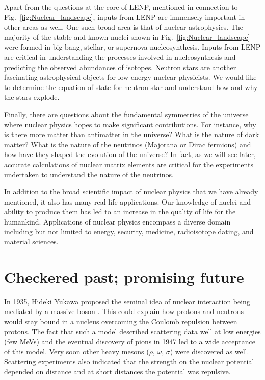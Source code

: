 	Apart from the questions at the core of LENP, mentioned in connection to
	Fig.~\ref{fig:Nuclear_landscape}, inputs from LENP are immensely important
	in other areas as well.  One such broad area is that of nuclear astrophysics.
	The majority of the stable
	and known nuclei shown in Fig.~\ref{fig:Nuclear_landscape} were formed in
	big bang, stellar, or supernova nucleosynthesis.  Inputs from LENP are
	critical in understanding the processes involved in nucleosynthesis and
	predicting the observed abundances of isotopes.
	Neutron stars are another fascinating astrophysical objects for low-energy
	nuclear physicists.  We would like to determine the equation of state for
	neutron star and understand how and why the stars explode.

	Finally, there are questions about the fundamental symmetries of the universe
	where
	nuclear physics hopes to make significant contributions.  For instance,
	why is there more matter than antimatter in the universe?  What is the nature
	of dark matter?  What is the nature of the neutrinos (Majorana or Dirac
	fermions) and how have they shaped the evolution of the universe?
	In fact, as we will see later, accurate calculations of nuclear matrix
	elements are critical for the experiments undertaken to understand the
	nature of the	neutrinos.

	In addition to the broad scientific impact of nuclear physics that we have
	already mentioned, it also has many real-life applications.  Our knowledge of
	nuclei and ability to produce them has led to an increase in the quality of
	life
	for the humankind.  Applications of nuclear physics encompass a diverse
	domain including but not limited to energy, security, medicine,
	radioisotope dating, and material sciences.


	\section{Checkered past; promising future}

	In 1935, Hideki Yukawa proposed the seminal idea of nuclear interaction
	being mediated by a massive boson \cite{Yukawa:1935xg}.   This could explain
	how protons and neutrons would stay bound in a nucleus overcoming the Coulomb
	repulsion between protons.  The fact that such a model described scattering
	data well at low energies (few MeVs) and the eventual discovery of pions in
	1947 led to a wide acceptance of this model.  Very soon other heavy mesons
	($\rho$, $\omega$, $\sigma$) were discovered as well.  Scattering experiments
	also indicated that the strength on the nuclear potential depended on
	distance and at short distances the potential was repulsive.

